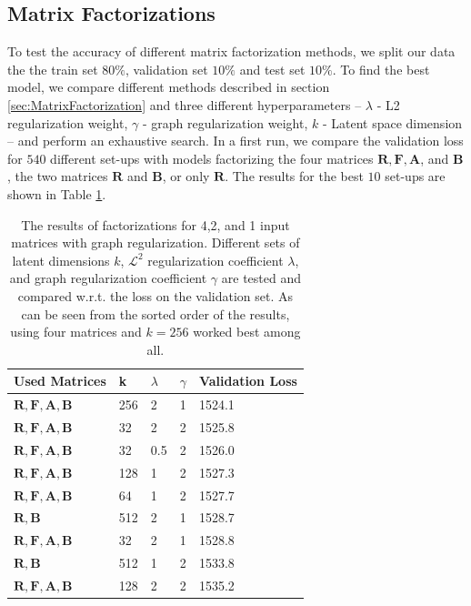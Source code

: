\documentclass[a4paper]{article}
\begin{document}
\subsection{Matrix Factorizations}
To test the accuracy of different matrix factorization methods, we split our data the  the train set $80\%$, validation set $10\%$ and test set $10\%$. To find the best model, we compare different methods described in section \ref{sec:MatrixFactorization} and three different hyperparameters -- $\lambda$ - L2 regularization weight, $\gamma$ - graph regularization weight, $k$ - Latent space dimension -- and perform an exhaustive search. In a first run, we compare the validation loss for $540$ different set-ups with models factorizing the four matrices $\mathbf{R}, \mathbf{F}, \mathbf{A}$, and  $\mathbf{B}$, the two matrices $\mathbf{R}$ and $\mathbf{B}$, or only $\mathbf{R}$. The results  for the best $10$ set-ups are shown in Table \ref{fig:mf_result_1}.
\begin{table}[h]
\centering
\begin{tabular}{| l | l | l | l | l |}
\hline
Used Matrices & k & $\lambda$ & $\gamma$ & Validation Loss \\ \hline
$\mathbf{R}, \mathbf{F}, \mathbf{A}, \mathbf{B}$ & 256 & 2 & 1 & 1524.1 \\ \hline
$\mathbf{R}, \mathbf{F}, \mathbf{A}, \mathbf{B}$ & 32 & 2 & 2 & 1525.8 \\ \hline
$\mathbf{R}, \mathbf{F}, \mathbf{A}, \mathbf{B}$ & 32 & 0.5 & 2 & 1526.0 \\ \hline
$\mathbf{R}, \mathbf{F}, \mathbf{A}, \mathbf{B}$ & 128 & 1 & 2 & 1527.3 \\ \hline
$\mathbf{R}, \mathbf{F}, \mathbf{A}, \mathbf{B}$ & 64 & 1 & 2 & 1527.7 \\ \hline
$\mathbf{R}, \mathbf{B}$ & 512 & 2 & 1 & 1528.7 \\ \hline
$\mathbf{R}, \mathbf{F}, \mathbf{A}, \mathbf{B}$ & 32 & 2 & 1 & 1528.8 \\ \hline
$\mathbf{R}, \mathbf{B}$ & 512 & 1 & 2 & 1533.8 \\ \hline
$\mathbf{R}, \mathbf{F}, \mathbf{A}, \mathbf{B}$ & 128 & 2 & 2 & 1535.2 \\
\hline
\end{tabular}
\caption{\label{fig:mf_result_1}The results of factorizations for 4,2, and 1 input matrices with graph regularization. Different sets of latent dimensions $k$, $\mathcal{L}^2$ regularization coefficient $\lambda$, and graph regularization coefficient $\gamma$ are tested and compared w.r.t. the loss on the validation set. As can be seen from the sorted order of the results, using four matrices and $k=256$ worked best among all.}
\end{table}
\end{document}
